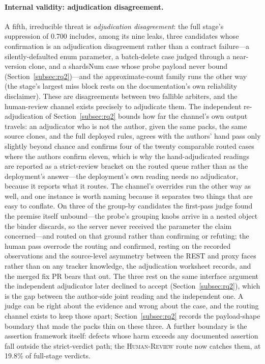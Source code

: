 \documentclass[acmsmall,screen,review,anonymous]{acmart}
\begin{document}
\paragraph{Internal validity: adjudication disagreement.}
A fifth, irreducible threat is \emph{adjudication disagreement}: the full stage's suppression of 0.700 includes, among its nine leaks, three candidates whose confirmation is an adjudication disagreement rather than a contract failure---a silently-defaulted enum parameter, a batch-delete case judged through a near-version clone, and a shardsNum case whose probe payload never bound (Section~\ref{subsec:rq2})---and the approximate-count family runs the other way (the stage's largest miss block rests on the documentation's own reliability disclaimer). These are disagreements between two fallible arbiters, and the human-review channel exists precisely to adjudicate them. The independent re-adjudication of Section~\ref{subsec:rq2} bounds how far the channel's own output travels: an adjudicator who is not the author, given the same packs, the same source clones, and the full deployed rules, agrees with the authors' hand pass only slightly beyond chance and confirms four of the twenty comparable routed cases where the authors confirm eleven, which is why the hand-adjudicated readings are reported as a strict-review bracket on the routed queue rather than as the deployment's answer---the deployment's own reading needs no adjudicator, because it reports what it routes. The channel's overrides run the other way as well, and one instance is worth naming because it separates two things that are easy to conflate. On three of the group-by candidates the first-pass judge found the premise itself unbound---the probe's grouping knobs arrive in a nested object the binder discards, so the server never received the parameter the claim concerned---and routed on that ground rather than confirming or refuting; the human pass overrode the routing and confirmed, resting on the recorded observations and the source-level asymmetry between the REST and proxy faces rather than on any tracker knowledge, the adjudication worksheet records, and the merged fix PR bears that out. The three rest on the same interface argument the independent adjudicator later declined to accept (Section~\ref{subsec:rq2}), which is the gap between the author-side joint reading and the independent one. A judge can be right about the evidence and wrong about the case, and the routing channel exists to keep those apart; Section~\ref{subsec:rq2} records the payload-shape boundary that made the packs thin on these three. A further boundary is the assertion framework itself: defects whose harm exceeds any documented assertion fall outside the strict-verdict path; the \textsc{Human-Review} route now catches them, at 19.8\% of full-stage verdicts.
\end{document}
